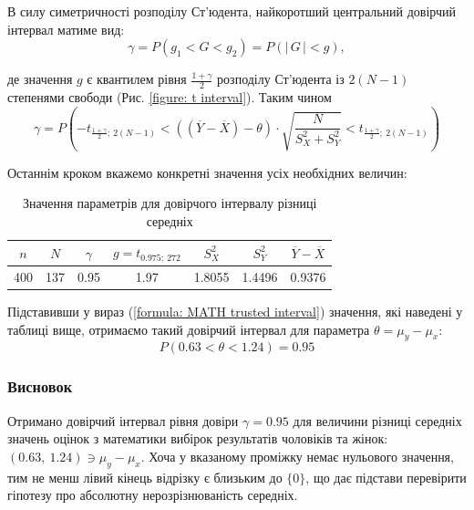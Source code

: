 В силу симетричності розподілу Ст'юдента, найкоротший центральний довірчий інтервал матиме вид:
\begin{equation*}
    \gamma = P(g_1<G<g_2)=P(|\, G\, |<g),
\end{equation*}

де значення $g$ є квантилем рівня $\frac{1+\gamma}{2}$ розподілу Ст'юдента із $2(N-1)$ степенями свободи 
(Рис. \ref{figure: t interval}). Таким чином
\begin{equation}
    \gamma = P\left(
        -t_{\tfrac{1+\gamma}{2};\ 2(N-1)} < 
        \left((\overline{Y}-\overline{X})-\theta\right)\cdot \sqrt{\frac{N}{S_X^2+S_Y^2}} < 
        t_{\tfrac{1+\gamma}{2};\ 2(N-1)}
    \right) \label{formula: MATH trusted interval}
\end{equation}

Останнім кроком вкажемо конкретні значення усіх необхідних величин:

\vspace{0.8cm}
\begin{table}[H]
    \begin{center}
        \begin{tabular}{||c|c|c|c|c|c|c||}
            \hline
            $n$ & $N$ & $\gamma$ & $g=t_{0.975;\ 272}$ & $S_X^2$ & $S_Y^2$ & $\overline{Y}-\overline{X}$ \\
            \hline \hline
            400 & 137 & 0.95 & 1.97 & 1.8055 & 1.4496 & 0.9376 \\
            \hline
        \end{tabular}
        \caption{Значення параметрів для довірчого інтервалу різниці середніх}
        \label{table: MATH t interval}
    \end{center}
\end{table}

Підставивши у вираз (\ref{formula: MATH trusted interval}) значення, які наведені у таблиці вище, отримаємо такий довірчий 
інтервал для параметра $\theta=\mu_y-\mu_x$:
\begin{equation}
    P(0.63 < \theta < 1.24)=0.95 \label{formula: calculated MATH trusted interval}
\end{equation}

\subsubsection{Висновок}

Отримано довірчий інтервал рівня довіри $\gamma=0.95$ для величини різниці середніх значень 
оцінок з математики вибірок результатів чоловіків та жінок: $(0.63,\ 1.24)\ni \mu_y-\mu_x$. Хоча у 
вказаному проміжку немає нульового значення, тим не менш лівий кінець відрізку є близьким до $\{0\}$, що 
дає підстави перевірити гіпотезу про абсолютну нерозрізнюваність середніх. 

